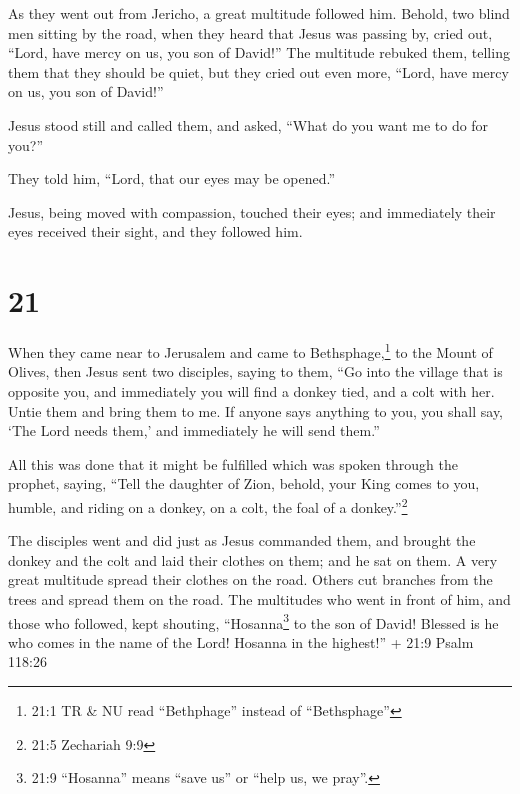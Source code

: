  As they went out from Jericho, a great multitude followed
him.  Behold, two blind men sitting by the road, when they
heard that Jesus was passing by, cried out, ``Lord, have mercy on us,
you son of David!''  The multitude rebuked them, telling
them that they should be quiet, but they cried out even more, ``Lord,
have mercy on us, you son of David!''

 Jesus stood still and called them, and asked, ``What do
you want me to do for you?''

 They told him, ``Lord, that our eyes may be opened.''

 Jesus, being moved with compassion, touched their eyes;
and immediately their eyes received their sight, and they followed him.

\hypertarget{section-20}{%
\section{21}\label{section-20}}

 When they came near to Jerusalem and came to
Bethsphage,\footnote{21:1 TR \& NU read ``Bethphage'' instead of
  ``Bethsphage''} to the Mount of Olives, then Jesus sent two disciples,
 saying to them, ``Go into the village that is opposite you,
and immediately you will find a donkey tied, and a colt with her. Untie
them and bring them to me.  If anyone says anything to you,
you shall say, `The Lord needs them,' and immediately he will send
them.''

 All this was done that it might be fulfilled which was
spoken through the prophet, saying,  ``Tell the daughter of
Zion, behold, your King comes to you, humble, and riding on a donkey, on
a colt, the foal of a donkey.''\footnote{21:5 Zechariah 9:9}

 The disciples went and did just as Jesus commanded them,
 and brought the donkey and the colt and laid their clothes
on them; and he sat on them.  A very great multitude spread
their clothes on the road. Others cut branches from the trees and spread
them on the road.  The multitudes who went in front of him,
and those who followed, kept shouting, ``Hosanna\footnote{21:9
  ``Hosanna'' means ``save us'' or ``help us, we pray''.} to the son of
David! Blessed is he who comes in the name of the Lord! Hosanna in the
highest!'' + 21:9 Psalm 118:26

